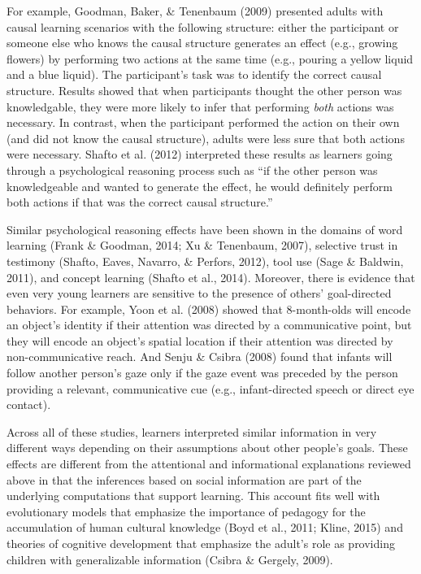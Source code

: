 \documentclass[a4paper,man,apacite,floatsintext]{apa6}
\begin{document}
For example, Goodman, Baker, \& Tenenbaum (2009) presented adults with
causal learning scenarios with the following structure: either the
participant or someone else who knows the causal structure generates an
effect (e.g., growing flowers) by performing two actions at the same
time (e.g., pouring a yellow liquid and a blue liquid). The
participant's task was to identify the correct causal structure. Results
showed that when participants thought the other person was knowledgable,
they were more likely to infer that performing \emph{both} actions was
necessary. In contrast, when the participant performed the action on
their own (and did not know the causal structure), adults were less sure
that both actions were necessary. Shafto et al. (2012) interpreted these
results as learners going through a psychological reasoning process such
as ``if the other person was knowledgeable and wanted to generate the
effect, he would definitely perform both actions if that was the correct
causal structure.''

Similar psychological reasoning effects have been shown in the domains
of word learning (Frank \& Goodman, 2014; Xu \& Tenenbaum, 2007),
selective trust in testimony (Shafto, Eaves, Navarro, \& Perfors, 2012),
tool use (Sage \& Baldwin, 2011), and concept learning (Shafto et al.,
2014). Moreover, there is evidence that even very young learners are
sensitive to the presence of others' goal-directed behaviors. For
example, Yoon et al. (2008) showed that 8-month-olds will encode an
object's identity if their attention was directed by a communicative
point, but they will encode an object's spatial location if their
attention was directed by non-communicative reach. And Senju \& Csibra
(2008) found that infants will follow another person's gaze only if the
gaze event was preceded by the person providing a relevant,
communicative cue (e.g., infant-directed speech or direct eye contact).

Across all of these studies, learners interpreted similar information in
very different ways depending on their assumptions about other people's
goals. These effects are different from the attentional and
informational explanations reviewed above in that the inferences based
on social information are part of the underlying computations that
support learning. This account fits well with evolutionary models that
emphasize the importance of pedagogy for the accumulation of human
cultural knowledge (Boyd et al., 2011; Kline, 2015) and theories of
cognitive development that emphasize the adult's role as providing
children with generalizable information (Csibra \& Gergely, 2009).
\end{document}
